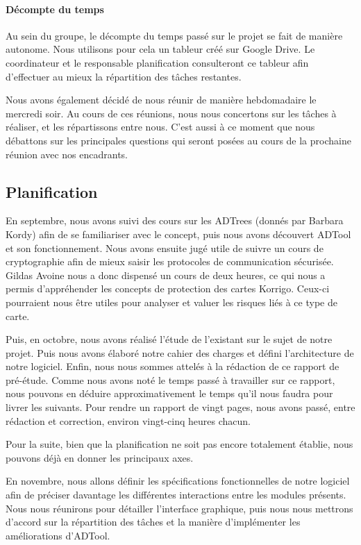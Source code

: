 	    \paragraph{Décompte du temps} Au sein du groupe, le décompte du temps passé sur le projet se fait de manière autonome. Nous utilisons pour cela un tableur créé sur Google Drive. Le coordinateur et le responsable planification consulteront ce tableur afin d'effectuer au mieux la répartition des tâches restantes.

	    Nous avons également décidé de nous réunir de manière hebdomadaire le mercredi soir. Au cours de ces réunions, nous nous concertons sur les tâches à réaliser, et les répartissons entre nous. C'est aussi à ce moment que nous débattons sur les principales questions qui seront posées au cours de la prochaine réunion avec nos encadrants.

	    
	\subsection{Planification}
		
		En septembre, nous avons suivi des cours sur les ADTrees (donnés par Barbara Kordy) afin de se familiariser avec le concept, puis nous avons découvert ADTool et son fonctionnement. Nous avons ensuite jugé utile de suivre un cours de cryptographie afin de mieux saisir les protocoles de communication sécurisée. Gildas Avoine nous a donc dispensé un cours de deux heures, ce qui nous a permis d'appréhender les concepts de protection des cartes Korrigo. Ceux-ci pourraient nous être utiles pour analyser et valuer les risques liés à ce type de carte.
		
		Puis, en octobre, nous avons réalisé l'étude de l'existant sur le sujet de notre projet. Puis nous avons élaboré notre cahier des charges et défini l'architecture de notre logiciel. Enfin, nous nous sommes attelés à la rédaction de ce rapport de pré-étude. Comme nous avons noté le temps passé à travailler sur ce rapport, nous pouvons en déduire approximativement le temps qu'il nous faudra pour livrer les suivants. Pour rendre un rapport de vingt pages, nous avons passé, entre rédaction et correction, environ vingt-cinq heures chacun.
		
		Pour la suite, bien que la planification ne soit pas encore totalement établie, nous pouvons déjà en donner les principaux axes. 

		En novembre, nous allons définir les spécifications fonctionnelles de notre logiciel afin de préciser davantage les différentes interactions entre les modules présents. Nous nous réunirons pour détailler l'interface graphique, puis nous nous mettrons d'accord sur la répartition des tâches et la manière d'implémenter les améliorations d'ADTool.

